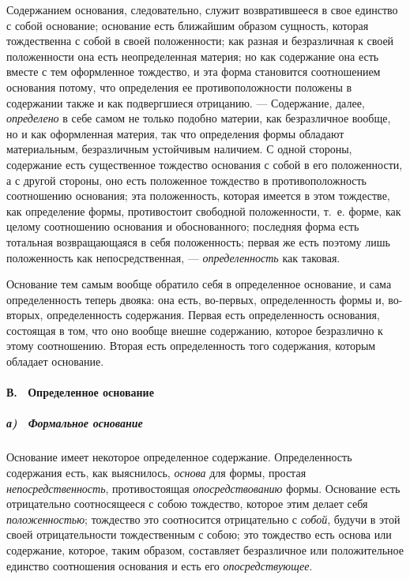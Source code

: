 Содержанием основания, следовательно, служит возвратившееся в свое единство
с собой основание; основание есть ближайшим образом сущность, которая
тождественна с собой в своей положенности; как разная и безразличная к
своей положенности она есть неопределенная материя; но как содержание она
есть вместе с тем оформленное тождество, и эта форма становится
соотношением основания потому, что определения ее противоположности
положены в содержании также и как подвергшиеся отрицанию. — Содержание,
далее, {\em определено} в себе самом не только подобно
материи, как безразличное вообще, но и как оформленная материя, так что
определения формы обладают материальным, безразличным устойчивым наличием.
С одной стороны, содержание есть существенное тождество основания с собой в
его положенности, а с другой стороны, оно есть положенное тождество в
противоположность соотношению основания; эта положенность, которая имеется
в этом тождестве, как определение формы, противостоит свободной
положенности, т.~е. форме, как целому соотношению основания и
обоснованного; последняя форма есть тотальная возвращающаяся в себя
положенность; первая же есть поэтому лишь положенность как
непосредственная, — {\em определенность} как таковая.

Основание тем самым вообще обратило себя в определенное основание, и сама
определенность теперь двояка: она есть, во-первых, определенность формы и,
во-вторых, определенность содержания. Первая есть определенность основания,
состоящая в том, что оно вообще внешне содержанию, которое безразлично к
этому соотношению. Вторая есть определенность того содержания, которым
обладает основание.

\paragraph[В. \ Определенное основание]{В. \ Определенное основание}
\hypertarget{Toc478978725}{}\subparagraph[а) \ Формальное основание]{а)
\ Формальное основание}
\hypertarget{Toc478978726}{}Основание имеет некоторое определенное
содержание. Определенность содержания есть, как выяснилось,
{\em основа} для формы, простая
{\em непосредственность}, противостоящая
{\em опосредствованию} формы. Основание есть
отрицательно соотносящееся с собою тождество, которое этим делает себя
{\em положенностью}; тождество это соотносится
отрицательно с {\em собой}, будучи в этой своей
отрицательности тождественным с собою; это тождество есть основа или
содержание, которое, таким образом, составляет безразличное или
положительное единство соотношения основания и есть его
{\em опосредствующее}.

